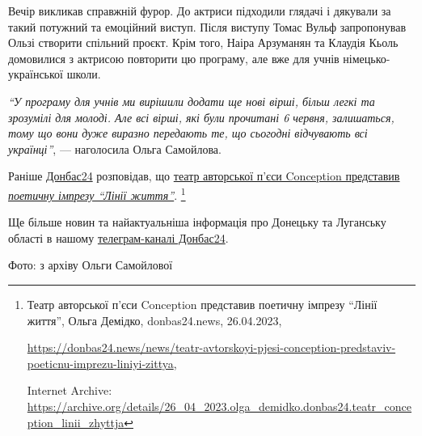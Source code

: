 Вечір викликав справжній фурор. До актриси підходили глядачі і дякували за
такий потужний та емоційний виступ. Після виступу Томас Вульф запропонував
Ользі створити спільний проєкт. Крім того, Наіра Арзуманян та Клаудія Кьоль
домовилися з актрисою повторити цю програму, але вже для учнів
німецько-української школи.

\begin{leftbar}
\emph{\enquote{У програму для учнів ми вирішили додати ще нові вірші, більш легкі та
зрозумілі для молоді. Але всі вірші, які були прочитані 6 червня,
залишаться, тому що вони дуже виразно передають те, що сьогодні
відчувають всі українці}}, — наголосила Ольга Самойлова.
\end{leftbar}


Раніше \href{https://donbas24.news}{Донбас24} розповідав, що \href{https://archive.org/details/26_04_2023.olga_demidko.donbas24.teatr_conception_linii_zhyttja}{театр авторської п'єси Conception представив
\emph{поетичну імпрезу \enquote{Лінії життя}}}.%
\footnote{Театр авторської п'єси Conception представив поетичну імпрезу \enquote{Лінії життя}, Ольга Демідко, donbas24.news, 26.04.2023, \par%
\url{https://donbas24.news/news/teatr-avtorskoyi-pjesi-conception-predstaviv-poeticnu-imprezu-liniyi-zittya}, \par%
Internet Archive: \url{https://archive.org/details/26_04_2023.olga_demidko.donbas24.teatr_conception_linii_zhyttja}%
}


Ще більше новин та найактуальніша інформація про Донецьку та Луганську області
в нашому \href{https://t.me/donbas24}{телеграм-каналі Донбас24}.

Фото: з архіву Ольги Самойлової

